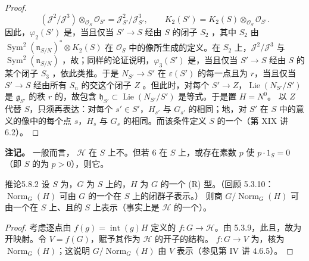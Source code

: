 \begin{proof}
\[(\mathcal J^2/\mathcal J^3)\otimes_{\mathcal O_S}\mathcal O_{S'}=\mathcal J_{S'}^2/\mathcal J_{S'}^3,\qquad K_2(S')=K_2(S)\otimes_{\mathcal O_S}\mathcal O_{S'}.\]
因此，$\varphi_2(S')$ 是，当且仅当 $S'\to S$ 经由 $S$ 的闭子 $S_2$ ，其中 $S_2$ 由 $\operatorname{Sym}^2(\mathfrak n_{S/N})^*\otimes K_2(S)$ 在 $\mathcal O_S$ 中的像所生成的定义。在 $S_2$ 上，$\mathcal J^2/\mathcal J^3$ 与 $\operatorname{Sym}^2(\mathfrak n_{S/N})$ ，故；同样的论证说明，$\varphi_3(S')$ 是，当且仅当 $S'\to S$ 经由 $S$ 的某个闭子 $S_3$ ，依此类推。于是 $N_{S'}\to S'$ 在 $\varepsilon(S')$ 的每一点且为 $r$，当且仅当 $S'\to S$ 经由所有 $S_n$ 的交这个闭子 $Z$ 。但此时，对每个 $S'\to Z$，$\operatorname{Lie}(N_{S'}/S')$ 是 $\mathfrak g_{S'}$ 的秩 $r$ 的，故包含 $\mathfrak h_{S'}\subset\operatorname{Lie}(N_{S'}/S')$ 是等式。于是置 $H=N^0$。
以 $Z$ 代替 $S$，只须再表达：对每个 $s'\in S'$，$H_{s'}$ 与 $G_{s'}$ 的相同；地，对 $S'$ 在 $S$ 中的意义的像中的每个点 $s$，$H_s$ 与 $G_s$ 的相同。而该条件定义 $S$ 的一个（第 XIX 讲 6.2）。
\end{proof}
\textbf{注记。} 一般而言， $\mathcal H$ 在 $S$ 上不。但若 $6$ 在 $S$ 上，或存在素数 $p$ 使 $p\cdot1_S=0$（即 $S$ 的为 $p>0$），则它。
\begin{SGAresult}{推论}{5.8.2}
设 $S$ 为，$G$ 为 $S$ 上的，$H$ 为 $G$ 的一个 (R) 型。（回顾 5.3.10：$\operatorname{Norm}_G(H)$ 可由 $G$ 的一个在 $S$ 上的闭群子表示。）
则商 $G/\operatorname{Norm}_G(H)$ 可由一个在 $S$ 上、且的 $S$ 上表示（事实上是 $\mathcal H$ 的一个）。
\end{SGAresult}
\begin{proof}
考虑逐点由 $f(g)=\operatorname{int}(g)H$ 定义的 $f:G\to\mathcal H$。由 5.3.9，此且，故为开映射。令 $V=f(G)$，赋予其作为 $\mathcal H$ 的开子的结构。 $f:G\to V$ 为，核为 $\operatorname{Norm}_G(H)$；这说明 $G/\operatorname{Norm}_G(H)$ 由 $V$ 表示（参见第 IV 讲 4.6.5）。
\end{proof}
